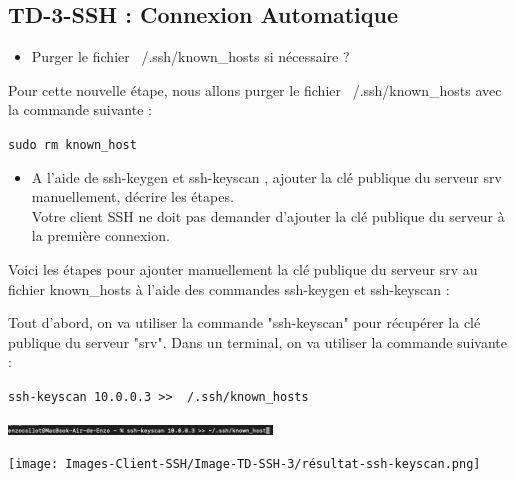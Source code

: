 \documentclass[12pt]{article}
\begin{document}
\subsection{TD-3-SSH : Connexion Automatique}

\begin{itemize}
  \item Purger le fichier ~/.ssh/known\_hosts si nécessaire ?
\end{itemize}

\vspace{0.3cm}

Pour cette nouvelle étape, nous allons purger le fichier ~/.ssh/known\_hosts avec la commande suivante : 

\texttt{sudo rm known\_host}

\vspace{0.3cm}

\begin{itemize}
  \item A l'aide de ssh-keygen et ssh-keyscan , ajouter la clé publique du serveur srv manuellement, décrire les étapes. \\
  Votre client SSH ne doit pas demander d'ajouter la clé publique du serveur à la première connexion.
\end{itemize}

\vspace{0.3cm}

Voici les étapes pour ajouter manuellement la clé publique du serveur srv au fichier known\_hosts à l'aide des commandes ssh-keygen et ssh-keyscan :

\vspace{0.3cm}

Tout d'abord, on va utiliser la commande "ssh-keyscan" pour récupérer la clé publique du serveur "srv". Dans un terminal, on va utiliser la commande suivante :

\texttt{ssh-keyscan 10.0.0.3 >> ~/.ssh/known\_hosts}

\vspace{0.3cm}

\begin{center}
  \includegraphics[width=7cm]{Images-Client-SSH/Image-TD-SSH-3/ssh-keyscan.png}
\end{center}

\vspace{0.3cm}

\begin{center}
  \texttt{[image: Images-Client-SSH/Image-TD-SSH-3/résultat-ssh-keyscan.png]}
\end{center}
\end{document}

